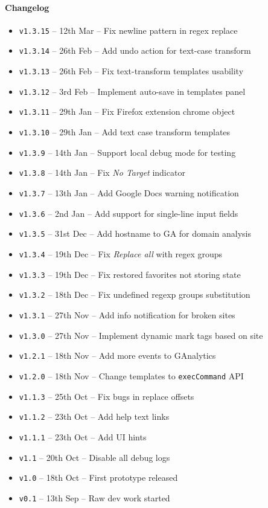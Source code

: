 \documentclass[bsc,frontabs,twoside,singlespacing,parskip,deptreport]{infthesis}
\providecommand{\tightlist}{%
  \setlength{\itemsep}{0pt}\setlength{\parskip}{0pt}}
\begin{document}
\paragraph*{Changelog}
\begin{itemize}
\tightlist
\item
\texttt{v1.3.15} -- 12th Mar -- Fix newline pattern in regex replace
\item
\texttt{v1.3.14} -- 26th Feb -- Add undo action for text-case transform
\item
\texttt{v1.3.13} -- 26th Feb -- Fix text-transform templates usability
\item
\texttt{v1.3.12} -- 3rd Feb -- Implement auto-save in templates panel
\item
\texttt{v1.3.11} -- 29th Jan -- Fix Firefox extension chrome object
\item
\texttt{v1.3.10} -- 29th Jan -- Add text case transform templates
\item
\texttt{v1.3.9} -- 14th Jan -- Support local debug mode for testing
\item
\texttt{v1.3.8} -- 14th Jan -- Fix \textit{No Target} indicator
\item
\texttt{v1.3.7} -- 13th Jan -- Add Google Docs warning notification
\item
\texttt{v1.3.6} -- 2nd Jan -- Add support for single-line input fields
\item
\texttt{v1.3.5} -- 31st Dec -- Add hostname to GA for domain analysis
\item
\texttt{v1.3.4} -- 19th Dec -- Fix \textit{Replace all} with regex groups
\item
\texttt{v1.3.3} -- 19th Dec -- Fix restored favorites not storing state
\item
\texttt{v1.3.2} -- 18th Dec -- Fix undefined regexp groups substitution
\item
\texttt{v1.3.1} -- 27th Nov -- Add info notification for broken sites
\item
\texttt{v1.3.0} -- 27th Nov -- Implement dynamic mark tags based on site
\item
\texttt{v1.2.1} -- 18th Nov -- Add more events to GAnalytics
\item
\texttt{v1.2.0} -- 18th Nov -- Change templates to \texttt{execCommand} API
\item
\texttt{v1.1.3} -- 25th Oct -- Fix bugs in replace offsets
\item
\texttt{v1.1.2} -- 23th Oct -- Add help text links
\item
\texttt{v1.1.1} -- 23th Oct -- Add UI hints
\item
\texttt{v1.1} -- 20th Oct -- Disable all debug logs
\item
\texttt{v1.0} -- 18th Oct -- First prototype released
\item
\texttt{v0.1} -- 13th Sep -- Raw dev work started
\end{itemize}
\end{document}
